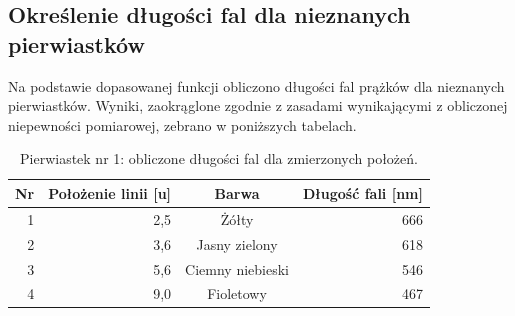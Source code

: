 \documentclass[a4paper,12pt]{article}
\begin{document}
\subsection{Określenie długości fal dla nieznanych pierwiastków}

Na podstawie dopasowanej funkcji obliczono długości fal prążków dla nieznanych pierwiastków. Wyniki, zaokrąglone zgodnie z zasadami wynikającymi z obliczonej niepewności pomiarowej, zebrano w poniższych tabelach.

\begin{table}[H]
    \centering
    \begin{tabular}{|r|r|c|r|}
        \hline
        Nr & Położenie linii [u] & Barwa & Długość fali [nm] \\ \hline
        1 & 2{,}5 & Żółty & 666 \\ \hline
        2 & 3{,}6 & Jasny zielony & 618 \\ \hline
        3 & 5{,}6 & Ciemny niebieski & 546 \\ \hline
        4 & 9{,}0 & Fioletowy & 467 \\ \hline
    \end{tabular}
    \caption{Pierwiastek nr 1: obliczone długości fal dla zmierzonych położeń.}
    \label{tab:unknown1}
\end{table}
\end{document}
